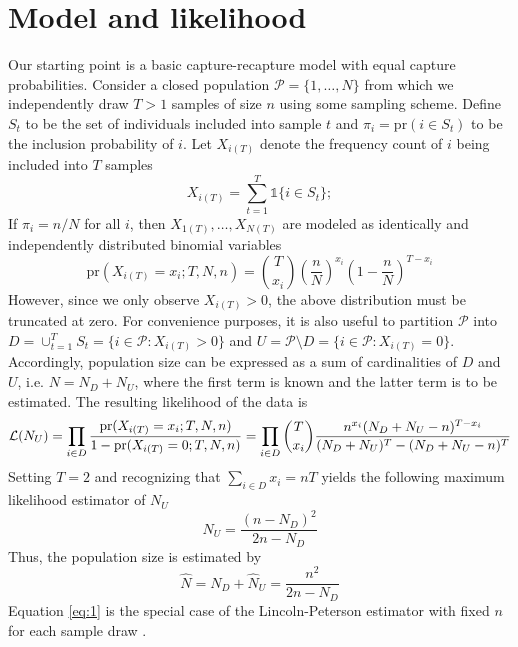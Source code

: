 \documentclass[manuscript]{biometrika}
\begin{document}
\section{Model and likelihood}
Our starting point is a basic capture-recapture model with equal capture probabilities. Consider a closed population $\mathcal{P} = \{1,\ldots,N\}$ from which we independently draw $T > 1$ samples of size $n$ using some sampling scheme. Define $S_t$ to be the set of individuals included into sample $t$ and $\pi_i = \text{pr}(i \in S_t)$ to be the inclusion probability of $i$. Let $X_{i(T)}$ denote the frequency count of $i$ being included into $T$ samples
\begin{equation*}
X_{i(T)} = \sum_{t=1}^T \mathds{1}\{i \in S_t\};
\end{equation*}
If $\pi_i = n / N$ for all $i$, then $X_{1(T)}, \ldots, X_{N(T)}$ are modeled as identically and independently distributed binomial variables
\begin{equation*}
\text{pr}(X_{i(T)} = x_i; T, N, n) = \binom{T}{x_i} \left(\frac{n}{N}\right)^{x_i} \left(1 - \frac{n}{N}\right)^{T - x_i}
\end{equation*}
However, since we only observe $X_{i(T)} > 0$, the above distribution must be truncated at zero. For convenience purposes, it is also useful to partition $\mathcal{P}$ into $D = \cup_{t=1}^T S_t = \{i \in \mathcal{P}: X_{i(T)} > 0\}$ and $U = \mathcal{P} \setminus D = \{i \in \mathcal{P}: X_{i(T)} = 0\}$. Accordingly, population size can be expressed as a sum of cardinalities of $D$ and $U$, i.e. $N = N_D + N_U$, where the first term is known and the latter term is to be estimated.  The resulting likelihood of the data is
\begin{equation*}
\mathcal{L}(N_U) = \prod_{i \in D} \frac{\text{pr}(X_{i(T)} = x_i; T, N, n)}{1 - \text{pr}(X_{i(T)} = 0; T, N, n)} = \prod_{i \in D} \binom{T}{x_i} \frac{n^{x_i} (N_D + N_U - n)^{T-x_i}}{(N_D + N_U)^{T} - (N_D + N_U - n)^T} \\
\end{equation*}
Setting $T = 2$ and recognizing that $\sum_{i \in D} x_i = nT$ yields the following maximum likelihood estimator of $N_U$
\begin{equation*}
\widehat{N}_U = \frac{(n - N_D)^2}{2n - N_D}
\end{equation*}
Thus, the population size is estimated by
\begin{equation} \label{eq:1}
\widehat{N} = N_D + \widehat{N}_U = \frac{n^2}{2n - N_D}
\end{equation}
Equation \eqref{eq:1} is the special case of the Lincoln-Peterson estimator with fixed $n$ for each sample draw \citep{Pollock:1990}.
\end{document}
